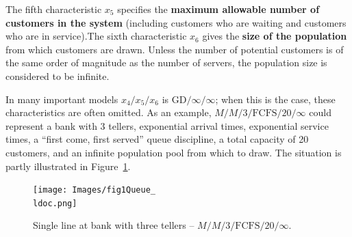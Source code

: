 \newl
The fifth characteristic $x_5$ specifies the \textbf{maximum allowable number of customers in the system} (including customers who are waiting and customers who are in service).\newl The sixth characteristic $x_6$ gives the \textbf{size of the population} from which customers are drawn. Unless the number of potential customers is of the same order of magnitude as the number of servers, the population size is considered to be infinite. \par In many important models $x_4/x_5/x_6$ is $\textrm{GD}/\infty/\infty$; when this is the case, these characteristics are often omitted.  
\newl As an example, $M/M/3/\textrm{FCFS}/20/\infty$ could represent a bank with 3 tellers, exponential arrival times, exponential service times, a ``first come, first served'' queue discipline, a total capacity of 20 customers, and an infinite population pool from which to draw. The situation is partly illustrated in Figure~\ref{fig:1}.
\begin{figure}[t]
	\centering
		\texttt{[image: Images/fig1Queue\_\\ldoc.png]}
	\caption[\small Single line at bank with $3$ tellers]{\small Single line at bank with three tellers -- $M/M/3/\textrm{FCFS}/20/\infty$.}
	\label{fig:1}
\end{figure}

